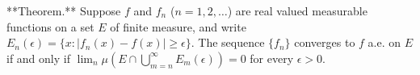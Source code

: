 **Theorem.** Suppose $f$ and $f_n$ ($n=1,2,\dots$) are real valued measurable functions on a set $E$ of finite measure, and write $E_n(\epsilon) = \{x: |f_n(x)-f(x)| \geq \epsilon\}$. The sequence $\{f_n\}$ converges to $f$ a.e. on $E$ if and only if $\lim_n \mu(E \cap \bigcup_{m=n}^{\infty} E_m(\epsilon)) = 0$ for every $\epsilon > 0$.
